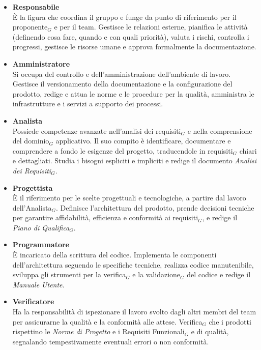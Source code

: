 \documentclass[a4paper, 10pt]{article}
\begin{document}
\begin{itemize}
    \item \textbf{Responsabile}\\
    È la figura che coordina il gruppo e funge da punto di riferimento per il proponente$_G$ e per il team. Gestisce le relazioni esterne, pianifica le attività (definendo cosa fare, quando e con quali priorità), valuta i rischi, controlla i progressi, gestisce le risorse umane e approva formalmente la documentazione.

    \item \textbf{Amministratore}\\
    Si occupa del controllo e dell'amministrazione dell'ambiente di lavoro. Gestisce il versionamento della documentazione e la configurazione del prodotto, redige e attua le norme e le procedure per la qualità, amministra le infrastrutture e i servizi a supporto dei processi.

    \item \textbf{Analista}\\
    Possiede competenze avanzate nell'analisi dei requisiti$_G$ e nella comprensione del dominio$_G$ applicativo. Il suo compito è identificare, documentare e comprendere a fondo le esigenze del progetto, traducendole in requisiti$_G$ chiari e dettagliati. Studia i bisogni espliciti e impliciti e redige il documento \emph{Analisi dei Requisiti}$_G$.

    \item \textbf{Progettista}\\
    È il riferimento per le scelte progettuali e tecnologiche, a partire dal lavoro dell'Analista$_G$. Definisce l'architettura del prodotto, prende decisioni tecniche per garantire affidabilità, efficienza e conformità ai requisiti$_G$, e redige il \emph{Piano di Qualifica}$_G$.

    \item \textbf{Programmatore}\\
    È incaricato della scrittura del codice. Implementa le componenti dell'architettura seguendo le specifiche tecniche, realizza codice manutenibile, sviluppa gli strumenti per la verifica$_G$ e la validazione$_G$ del codice e redige il \emph{Manuale Utente}.

    \item \textbf{Verificatore}\\
    Ha la responsabilità di ispezionare il lavoro svolto dagli altri membri del team per assicurarne la qualità e la conformità alle attese. Verifica$_G$ che i prodotti rispettino le \emph{Norme di Progetto} e i Requisiti Funzionali$_G$ e di qualità, segnalando tempestivamente eventuali errori o non conformità.
\end{itemize}
\end{document}
